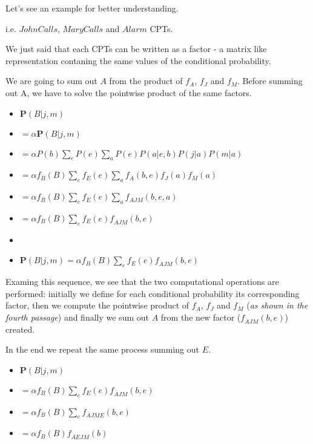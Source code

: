 Let's see an example for better understanding.
\begin{example}
    i.e. $JohnCalls$, $MaryCalls$ and $Alarm$ CPTs.
    \begin{center}
    \end{center}

    We just said that each CPTs can be written as a factor - a matrix like representation contaning the same values of the conditional probability. \vspace{3.5pt}

    We are going to sum out $A$ from the product of $f_A$, $f_J$ and $f_M$. Before summing out A, we have to solve the pointwise product of the same factors. \vspace{3.5pt}

    \begin{itemize}
        \renewcommand{\labelitemi}{}
        \item $\mathbf{P}(B|j,m)$
        \item $= \alpha \mathbf{P}(B|j, m)$
        \item $= \alpha P(b)\sum_{e}P(e)\sum_{a}P(e)P(a|e, b)P(j|a)P(m|a)$
        \item $= \alpha f_B(B) \sum_{e} f_E(e) \sum_{a} f_A(b, e) f_J(a) f_M(a)$
        \item $= \alpha f_B(B) \sum_{e} f_E(e) \sum_{a} f_{AJM}(b, e, a)$
        \item $= \alpha f_B(B) \sum_{e} f_E(e) f_{\overline{A}JM}(b, e)$
        \item 
        \item $\mathbf{P}(B|j,m) = \alpha f_B(B) \sum_{e} f_E(e) f_{\overline{A}JM}(b, e)$
    \end{itemize} \vspace{7pt}
    Examing this sequence, we see that the two computational operations are performed: initially we define for each conditional probability its corresponding factor,
    then we compute the pointwise product of $f_A$, $f_J$ and $f_M$ (\textit{as shown in the fourth passage}) and finally we sum out $A$ from the new factor ($f_{\overline{A}JM}(b, e)$)
    created. \vspace{7pt}

    In the end we repeat the same process summing out $E$.
    \begin{itemize}
        \renewcommand{\labelitemi}{}
        \item $\mathbf{P}(B|j,m)$
        \item $= \alpha f_B(B) \sum_{e} f_E(e) f_{\overline{A}JM}(b, e)$
        \item $= \alpha f_B(B) \sum_{e} f_{\overline{A}JME}(b, e)$
        \item $= \alpha f_B(B) f_{\overline{AE}JM}(b)$
    \end{itemize}
\end{example}
